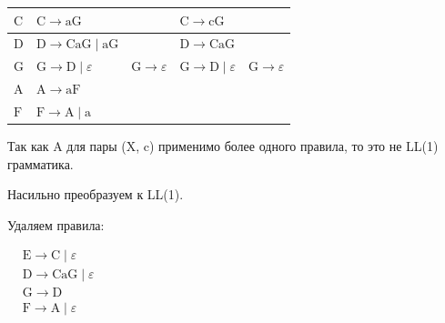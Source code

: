 \documentclass[12pt,onecolumn]{article}
\begin{document}
\begin{table}[H]
{\begin{tabular}{|l|llll|}
            $\mathrm{C}$         & \multicolumn{1}{l|}{$ \mathrm{C}   \to  \mathrm{aG} $ }                                     & \multicolumn{1}{l|}{}                                                    & \multicolumn{1}{l|}{$ \mathrm{C}   \to  \mathrm{cG} $ }                  &                                 \\ \hline
            $\mathrm{D}$         & \multicolumn{1}{l|}{$ \mathrm{D}   \to  \mathrm{CaG}   \mid   \mathrm{aG} $ }               & \multicolumn{1}{l|}{}                                                    & \multicolumn{1}{l|}{$ \mathrm{D}   \to  \mathrm{CaG} $ }                 &                                 \\ \hline
            $\mathrm{G}$         & \multicolumn{1}{l|}{$ \mathrm{G}   \to  \mathrm{D}   \mid  \varepsilon$}                    & \multicolumn{1}{l|}{$ \mathrm{G}   \to \varepsilon$}                     & \multicolumn{1}{l|}{$ \mathrm{G}   \to  \mathrm{D}   \mid  \varepsilon$} & $ \mathrm{G}   \to \varepsilon$ \\ \hline
            $\mathrm{A}$         & \multicolumn{1}{l|}{$ \mathrm{A}   \to  \mathrm{aF} $ }                                     & \multicolumn{1}{l|}{}                                                    & \multicolumn{1}{l|}{}                                                    &                                 \\ \hline
            $\mathrm{F}$         & \multicolumn{1}{l|}{$ \mathrm{F}   \to  \mathrm{A}   \mid   \mathrm{a} $ }                  & \multicolumn{1}{l|}{}                                                    & \multicolumn{1}{l|}{}                                                    &                                 \\ \hline
        \end{tabular}%
    }
\end{table}

Так как A для пары (X, c) применимо более
одного правила, то это не LL(1)
грамматика.

Насильно преобразуем к LL(1).

Удаляем правила:

$\begin{aligned}
         & \mathrm{E} \to \mathrm{C} \mid \varepsilon   \\
         & \mathrm{D} \to \mathrm{CaG} \mid \varepsilon \\
         & \mathrm{G} \to  \mathrm{D}                   \\
         & \mathrm{F} \to \mathrm{A} \mid \varepsilon
    \end{aligned}$
\end{document}
